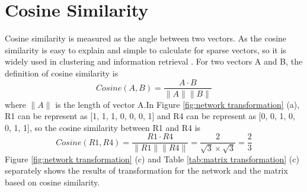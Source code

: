 \documentclass[12pt,oneside,final]{vlsithesis}
\begin{document}
\section{Cosine Similarity}
Cosine similarity \cite{huang2008similarity}  is measured as the angle between two vectors. As the cosine similarity is easy to explain and simple to calculate for sparse vectors, so it is widely used in clustering \cite{larsen1999fast} and information retrieval \cite{baeza1999modern}.  For two vectors A and B, the definition of cosine similarity is
\begin{equation*}
Cosine(A,B) = \dfrac{A \cdot B}{\parallel A \parallel \parallel B \parallel}	
\end{equation*}
where $\parallel A \parallel$ is the length of vector A.In Figure \ref{fig:network transformation} (a), R1 can be represent as [1, 1, 1, 0, 0, 0, 1] and R4 can be represent as [0, 0, 1, 0, 0, 1, 1], so the cosine similarity between R1 and R4 is
\begin{equation*}
Cosine(R1,R4) = \dfrac{R1 \cdot R4}{\parallel R1 \parallel \parallel R4 \parallel} = \frac{2}{ \sqrt{3}\times \sqrt{3} } = \frac{2}{3}
\end{equation*}
Figure \ref{fig:network transformation} (c) and Table \ref{tab:matrix transformation} (c) separately shows the results of transformation for the network and the matrix based on cosine similarity.
\end{document}
